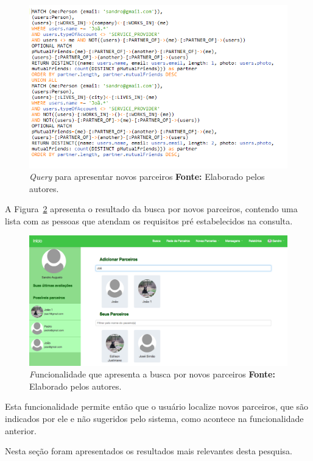 \begin{figure}[h!]
	\centerline{\includegraphics[scale=0.6]{./imagens/consulta-busca-novos-parceiros.png}}
	\caption[\textit{Query} para apresentar novos parceiros.]
	{\textit{Query} para apresentar novos parceiros \textbf{Fonte:} Elaborado pelos autores.}
	\label{fig:consulta_novos_parceiros}
\end{figure}

\par A Figura~\ref{fig:busca_novos_parceiros} apresenta o resultado da busca por novos parceiros, contendo uma lista com as pessoas que atendam os requisitos pré estabelecidos na consulta.

\begin{figure}[h!]
	\centerline{\includegraphics[scale=0.3]{./imagens/busca-novos-parceiros.png}}
	\caption[\textit Funcionalidade que apresenta a busca por novos parceiros]
	{\textit Funcionalidade que apresenta a busca por novos parceiros \textbf{Fonte:} Elaborado pelos autores.}
	\label{fig:busca_novos_parceiros}
\end{figure}

\par  Esta funcionalidade permite então que o usuário localize novos parceiros, que são indicados por ele e não sugeridos pelo sistema, como acontece na funcionalidade anterior.

\par Nesta seção foram apresentados os resultados mais relevantes desta pesquisa.
